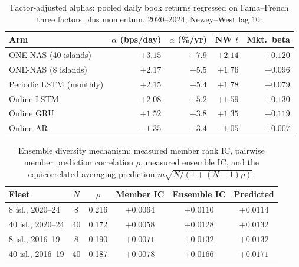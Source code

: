 \begin{table}[h]
\centering
\caption{Factor-adjusted alphas: pooled daily book returns regressed on
Fama--French three factors plus momentum, 2020--2024, Newey--West lag 10.}
\label{tab:alphas}
\begin{tabular}{lrrrr}
\toprule
Arm & $\alpha$ (bps/day) & $\alpha$ (\%/yr) & NW $t$ & Mkt.\ beta \\
\midrule
ONE-NAS (40 islands)     & $+3.15$ & $+7.9$ & $+2.14$ & $+0.120$ \\
ONE-NAS (8 islands)      & $+2.17$ & $+5.5$ & $+1.76$ & $+0.096$ \\
Periodic LSTM (monthly)  & $+2.15$ & $+5.4$ & $+1.78$ & $+0.079$ \\
Online LSTM              & $+2.08$ & $+5.2$ & $+1.59$ & $+0.130$ \\
Online GRU               & $+1.52$ & $+3.8$ & $+1.35$ & $+0.119$ \\
Online AR                & $-1.35$ & $-3.4$ & $-1.05$ & $+0.007$ \\
\bottomrule
\end{tabular}
\end{table}

\begin{table}[h]
\centering
\caption{Ensemble diversity mechanism: measured member rank IC, pairwise
member prediction correlation $\rho$, measured ensemble IC, and the
equicorrelated averaging prediction $m\sqrt{N/(1+(N-1)\rho)}$.}
\label{tab:diversity}
\begin{tabular}{lccccc}
\toprule
Fleet & $N$ & $\rho$ & Member IC & Ensemble IC & Predicted \\
\midrule
8 isl., 2020--24  & 8  & 0.216 & $+0.0064$ & $+0.0110$ & $+0.0114$ \\
40 isl., 2020--24 & 40 & 0.172 & $+0.0058$ & $+0.0128$ & $+0.0132$ \\
8 isl., 2016--19  & 8  & 0.190 & $+0.0071$ & $+0.0132$ & $+0.0132$ \\
40 isl., 2016--19 & 40 & 0.187 & $+0.0078$ & $+0.0166$ & $+0.0171$ \\
\bottomrule
\end{tabular}
\end{table}

